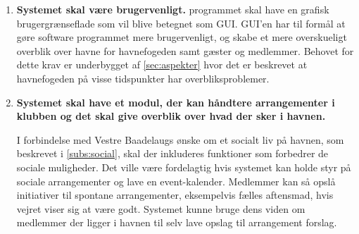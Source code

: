 \begin{enumerate}[resume]
	\item \label{itm:gui} \textbf{Systemet skal være brugervenligt.}	
		programmet skal have en grafisk brugergrænseflade som vil blive betegnet som GUI. GUI'en har til formål at gøre software programmet mere brugervenligt, og skabe et mere overskueligt overblik over havne for havnefogeden samt gæster og medlemmer. Behovet for dette krav er underbygget af \cref{sec:aspekter} hvor det er beskrevet at havnefogeden på visse tidspunkter har overbliksproblemer.

	\item \label{itm:events} \textbf{Systemet skal have et modul, der kan håndtere arrangementer i klubben og det skal give overblik over hvad der sker i havnen.}

I forbindelse med Vestre Baadelaugs ønske om et socialt liv på havnen, som beskrevet i \cref{subs:social}, skal der inkluderes funktioner som forbedrer de sociale muligheder. Det ville være fordelagtig hvis systemet kan holde styr på sociale arrangementer og lave en event-kalender. Medlemmer kan så opslå initiativer til spontane arrangementer, eksempelvis fælles aftensmad, hvis vejret viser sig at være godt. Systemet kunne bruge dens viden om medlemmer der ligger i havnen til selv lave opslag til arrangement forslag.
	
\end{enumerate}


